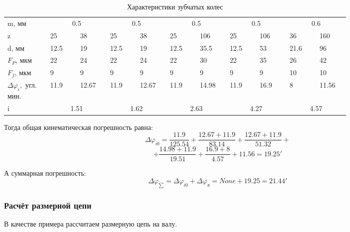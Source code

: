 \documentclass[14pt,a4paper,russian]{scrartcl}
\begin{document}
        \begin{table}[h!]
            \begin{center}
                \begin{tabular}{p{0.1\linewidth}|p{0.07\linewidth}p{0.07\linewidth}p{0.07\linewidth}p{0.07\linewidth}p{0.07\linewidth}p{0.07\linewidth}p{0.07\linewidth}p{0.07\linewidth}p{0.07\linewidth}p{0.07\linewidth}}
                    \hline
                    m, мм  & \multicolumn{2}{c}{0.5} & \multicolumn{2}{c}{0.5} & \multicolumn{2}{c}{0.5} & \multicolumn{2}{c}{0.5} & \multicolumn{2}{c}{0.6} \\
                    z       & 25 &  38 &  25 &  38 &  25 & 106 &   25 &  106 &  36 &  160 \\
                    d, мм   & 12.5 &  19 &  12.5 &  19 &  12.5 & 35.5 &   12.5 &  53 &  21.6 &  96 \\
                    \( F_P \), мкм & 22 & 24 & 22 & 24 & 22 & 30 & 22 & 35 & 26 & 42 \\
                    \( F_f \), мкм & 9 & 9 & 9 & 9 & 9 & 9 & 9 & 9 & 10 & 10 \\
                    \( \Delta\varphi_{i},  \) угл. мин. & 11.9 & 12.67 & 11.9 & 12.67 & 11.9 & 14.98 & 11.9 & 16.9 & 8 & 11.56 \\
                    i  & \multicolumn{2}{c}{1.51} & \multicolumn{2}{c}{1.62} & \multicolumn{2}{c}{2.63} & \multicolumn{2}{c}{4.27} & \multicolumn{2}{c}{4.57} \\
                    \hline
                \end{tabular}
                \caption{{Характеристики зубчатых колес}}\label{tab:gears_digest}
            \end{center}
        \end{table}

        Тогда общая кинематическая погрешность равна:
        \[ \Delta\varphi_{i0} = 
                \frac{11.9}{125.54}
                + \frac{12.67+11.9}{83.14}
                + \frac{12.67+11.9}{51.32}+\]
              \[+ \frac{14.98+11.9}{19.51}
                + \frac{16.9+8}{4.57}
                + 11.56 = 19.25'\]
        
        А суммарная погрешность:
        \[ \Delta\varphi_{\sum} = \Delta\varphi_{i0}  + \Delta\varphi_{\text{л}} 
        = None + 19.25 = 21.44' \]

    
    \subsubsection{Расчёт размерной цепи}
        В качестве примера рассчитаем размерную цепь на валу. 
\end{document}
